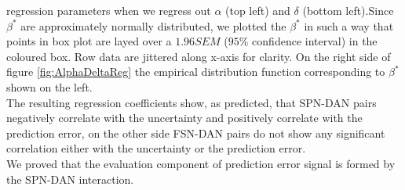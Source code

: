 regression parameters when we regress out $\alpha$ (top left) and $\delta$ (bottom left).Since $\beta^*$ are approximately normally distributed, we plotted the $\beta^*$ in such a way that points in box plot are layed over a $1.96 SEM$ ($95\%$ confidence interval) in the coloured box. Row data are jittered along x-axis for clarity. On the right side of figure \ref{fig:AlphaDeltaReg} the empirical distribution function corresponding to $\beta^*$ shown on the left.\\
The resulting regression coefficients show, as predicted, that SPN-DAN pairs negatively correlate with the uncertainty and positively correlate with the prediction error, on the other side FSN-DAN pairs do not show any significant correlation either with the uncertainty or the prediction error.\\We proved that the evaluation component of prediction error signal is formed by the SPN-DAN interaction. 
